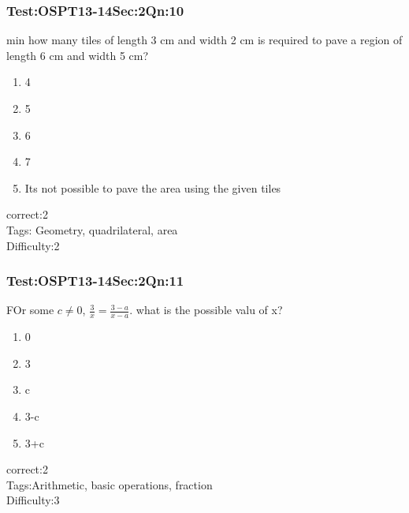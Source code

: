 \documentclass[]{beamer}
\begin{document}
    \begin{frame}
	    \frametitle{Test:OSPT13-14\hspace{2mm}Sec:2\hspace{2mm}Qn:10}
	    min how many tiles of length 3 cm and width 2 cm is required to pave a region of length 6 cm and width 5 cm?
	   \begin{enumerate}
	        \item
	            4
	        \item
	            5
	        \item
	            6
	        \item
	            7
	        \item
	            Its not possible to pave the area using the given tiles
	    \end{enumerate}
	    correct:2\\   
	    Tags: Geometry, quadrilateral, area\\
	    Difficulty:2   \\
    \end{frame}    
    \begin{frame}
	    \frametitle{Test:OSPT13-14\hspace{2mm}Sec:2\hspace{2mm}Qn:11}
	    FOr some $c\neq0$, $\frac{3}{x}=\frac{3-a}{x-a}$. what is the possible valu of x?
	   \begin{enumerate}
	        \item
	           0
	        \item
	            3
	        \item
	           c
	        \item
	            3-c
	        \item
	           3+c
	    \end{enumerate}
	    correct:2\\   
	    Tags:Arithmetic, basic operations, fraction \\
	    Difficulty:3   \\
    \end{frame}    
\end{document}
